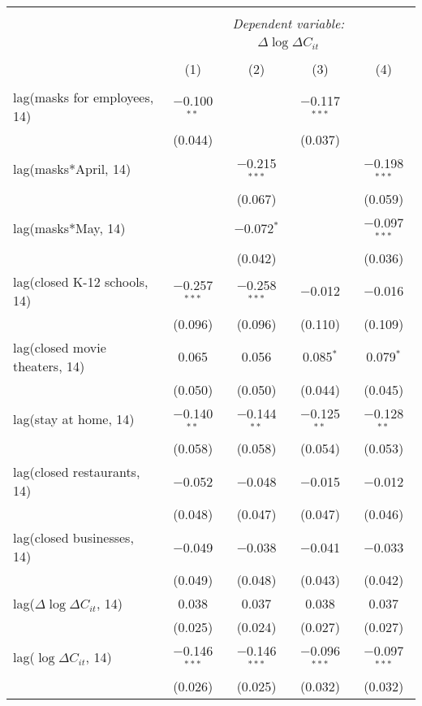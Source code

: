 \begin{tabular}{@{\extracolsep{1pt}}lcccc} 
\\[-1.8ex]\hline 
\hline \\[-1.8ex] 
 & \multicolumn{4}{c}{\textit{Dependent variable:}} \\ 
\cline{2-5} 
 & \multicolumn{4}{c}{$\Delta \log \Delta C_{it}$} \\ 
\\[-1.8ex] & (1) & (2) & (3) & (4)\\ 
\hline \\[-1.8ex] 
 lag(masks for employees, 14) & $-$0.100$^{**}$ &  & $-$0.117$^{***}$ &  \\ 
  & (0.044) &  & (0.037) &  \\ 
  lag(masks*April, 14) &  & $-$0.215$^{***}$ &  & $-$0.198$^{***}$ \\ 
  &  & (0.067) &  & (0.059) \\ 
  lag(masks*May, 14) &  & $-$0.072$^{*}$ &  & $-$0.097$^{***}$ \\ 
  &  & (0.042) &  & (0.036) \\ 
  lag(closed K-12 schools, 14) & $-$0.257$^{***}$ & $-$0.258$^{***}$ & $-$0.012 & $-$0.016 \\ 
  & (0.096) & (0.096) & (0.110) & (0.109) \\ 
  lag(closed movie theaters, 14) & 0.065 & 0.056 & 0.085$^{*}$ & 0.079$^{*}$ \\ 
  & (0.050) & (0.050) & (0.044) & (0.045) \\ 
  lag(stay at home, 14) & $-$0.140$^{**}$ & $-$0.144$^{**}$ & $-$0.125$^{**}$ & $-$0.128$^{**}$ \\ 
  & (0.058) & (0.058) & (0.054) & (0.053) \\ 
  lag(closed restaurants, 14) & $-$0.052 & $-$0.048 & $-$0.015 & $-$0.012 \\ 
  & (0.048) & (0.047) & (0.047) & (0.046) \\ 
  lag(closed businesses, 14) & $-$0.049 & $-$0.038 & $-$0.041 & $-$0.033 \\ 
  & (0.049) & (0.048) & (0.043) & (0.042) \\ 
  lag($\Delta \log \Delta C_{it}$, 14) & 0.038 & 0.037 & 0.038 & 0.037 \\ 
  & (0.025) & (0.024) & (0.027) & (0.027) \\ 
  lag($\log \Delta C_{it}$, 14) & $-$0.146$^{***}$ & $-$0.146$^{***}$ & $-$0.096$^{***}$ & $-$0.097$^{***}$ \\ 
  & (0.026) & (0.025) & (0.032) & (0.032) \\ 

\end{tabular}
